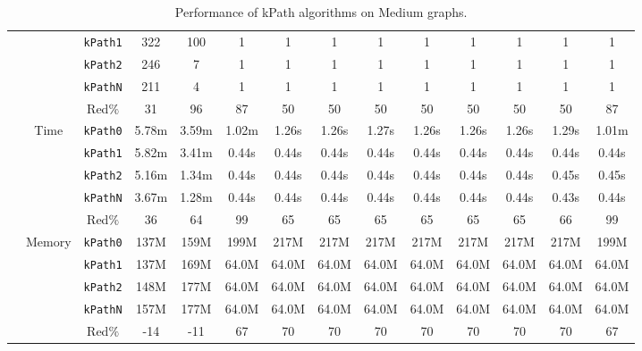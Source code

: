\begin{table}[h!]
{\begin{tabular}{|l|c|c|c|c|c|c|c|c|c|c|c|c|c|}
& & \texttt{kPath1} & 322 & 100 & 1 & 1 & 1 & 1 & 1 & 1 & 1 & 1 & 1 \\
& & \texttt{kPath2} & 246 & 7 & 1 & 1 & 1 & 1 & 1 & 1 & 1 & 1 & 1 \\
& & \texttt{kPathN} & 211 & 4 & 1 & 1 & 1 & 1 & 1 & 1 & 1 & 1 & 1 \\
& & Red$\%$ & 31 & 96 & 87 & 50 & 50 & 50 & 50 & 50 & 50 & 50 & 87 \\
\cline{2-14} &
\multirow{5}{*}{Time}
& \texttt{kPath0} & 5.78m & 3.59m & 1.02m & 1.26s & 1.26s & 1.27s & 1.26s & 1.26s & 1.26s & 1.29s & 1.01m \\
& & \texttt{kPath1} & 5.82m & 3.41m & 0.44s & 0.44s & 0.44s & 0.44s & 0.44s & 0.44s & 0.44s & 0.44s & 0.44s \\
& & \texttt{kPath2} & 5.16m & 1.34m & 0.44s & 0.44s & 0.44s & 0.44s & 0.44s & 0.44s & 0.44s & 0.45s & 0.45s \\
& & \texttt{kPathN} & 3.67m & 1.28m & 0.44s & 0.44s & 0.44s & 0.44s & 0.44s & 0.44s & 0.44s & 0.43s & 0.44s \\
& & Red$\%$ & 36 & 64 & 99 & 65 & 65 & 65 & 65 & 65 & 65 & 66 & 99 \\
\cline{2-14} &
\multirow{5}{*}{Memory}
& \texttt{kPath0} & 137M & 159M & 199M & 217M & 217M & 217M & 217M & 217M & 217M & 217M & 199M \\
& & \texttt{kPath1} & 137M & 169M & 64.0M & 64.0M & 64.0M & 64.0M & 64.0M & 64.0M & 64.0M & 64.0M & 64.0M \\
& & \texttt{kPath2} & 148M & 177M & 64.0M & 64.0M & 64.0M & 64.0M & 64.0M & 64.0M & 64.0M & 64.0M & 64.0M \\
& & \texttt{kPathN} & 157M & 177M & 64.0M & 64.0M & 64.0M & 64.0M & 64.0M & 64.0M & 64.0M & 64.0M & 64.0M \\
& & Red$\%$ & -14 & -11 & 67 & 70 & 70 & 70 & 70 & 70 & 70 & 70 & 67 \\
\hline
\end{tabular}%
}
\caption{Performance of kPath algorithms on Medium graphs.}
\label{tab:medium_kpath}
\end{table}
